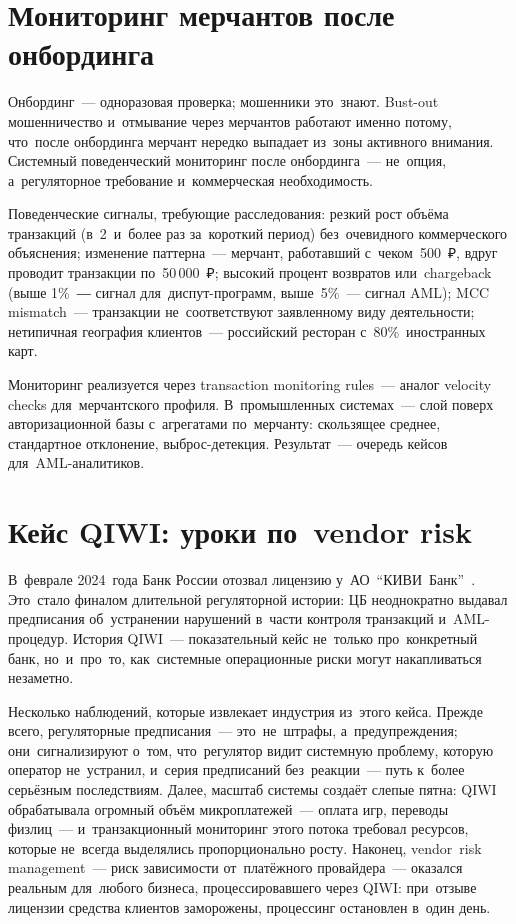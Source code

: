 \section{Мониторинг мерчантов после онбординга}
\label{sec:compliance-merchant-monitoring}

Онбординг~--- одноразовая проверка; мошенники это~знают. Bust-out
мошенничество и~отмывание через мерчантов работают именно потому,
что~после онбординга мерчант нередко выпадает из~зоны активного
внимания. Системный поведенческий мониторинг после онбординга~---
не~опция, а~регуляторное требование и~коммерческая необходимость.

Поведенческие сигналы, требующие расследования: резкий рост объёма
транзакций (в~2~и~более раз за~короткий период) без~очевидного коммерческого
объяснения; изменение паттерна~--- мерчант, работавший с~чеком~500~₽,
вдруг проводит транзакции по~50\,000~₽; высокий процент возвратов или~chargeback
(выше 1\%~― сигнал для~диспут-программ, выше~5\%~--- сигнал AML);
MCC mismatch~--- транзакции не~соответствуют заявленному виду деятельности;
нетипичная география клиентов~--- российский ресторан с~80\%~иностранных
карт.

Мониторинг реализуется через transaction monitoring rules~--- аналог
velocity checks для~мерчантского профиля. В~промышленных системах~---
слой поверх авторизационной базы с~агрегатами по~мерчанту: скользящее
среднее, стандартное отклонение, выброс-детекция. Результат~--- очередь
кейсов для~AML-аналитиков.


\section{Кейс QIWI: уроки по~vendor risk}
\label{sec:compliance-qiwi}

В~феврале 2024~года Банк России отозвал лицензию у~АО~\enquote{КИВИ~Банк}~.
Это~стало финалом длительной регуляторной истории: ЦБ неоднократно
выдавал предписания об~устранении нарушений в~части контроля транзакций
и~AML-процедур. История QIWI~--- показательный кейс не~только про~конкретный
банк, но~и~про~то, как~системные операционные риски могут накапливаться
незаметно.

Несколько наблюдений, которые извлекает индустрия из~этого кейса.
Прежде всего, регуляторные предписания~--- это~не~штрафы, а~предупреждения;
они~сигнализируют о~том, что~регулятор видит системную проблему, которую
оператор не~устранил, и~серия предписаний без~реакции~--- путь к~более
серьёзным последствиям. Далее, масштаб системы создаёт слепые
пятна: QIWI обрабатывала огромный объём микроплатежей~--- оплата
игр, переводы физлиц~--- и~транзакционный мониторинг этого потока
требовал ресурсов, которые не~всегда выделялись пропорционально росту.
Наконец, vendor~risk management~--- риск зависимости от~платёжного
провайдера~--- оказался реальным для~любого бизнеса, процессировавшего через QIWI:
при~отзыве лицензии средства клиентов заморожены, процессинг остановлен
в~один день.

